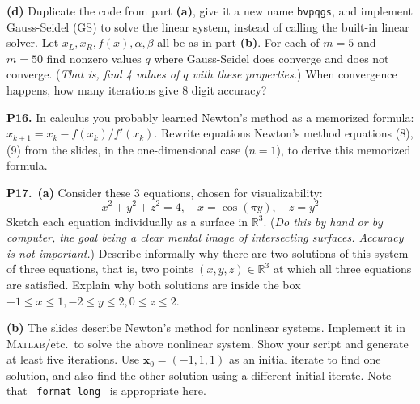 \documentclass[12pt]{amsart}
\newcommand{\bx}{\mathbf{x}}
\newcommand{\RR}{\mathbb{R}}
\newcommand{\prob}[1]{\bigskip\noindent\textbf{#1.}\quad }
\newcommand{\epart}[1]{\medskip\noindent\textbf{(#1)}\quad }
\newcommand{\ppart}[1]{\,\textbf{(#1)}\quad }
\newcommand{\Matlab}{\textsc{Matlab}\xspace}
\begin{document}
\epart{d}  Duplicate the code from part \textbf{(a)}, give it a new name \texttt{bvpqgs}, and implement Gauss-Seidel (GS) to solve the linear system, instead of calling the built-in linear solver.  Let $x_L,x_R,f(x),\alpha,\beta$ all be as in part \textbf{(b)}.  For each of $m=5$ and $m=50$ find nonzero values $q$ where Gauss-Seidel does converge and does not converge.  (\emph{That is, find 4 values of $q$ with these properties.})  When convergence happens, how many iterations give 8 digit accuracy?


\prob{P16}  In calculus you probably learned Newton's method as a memorized formula: $x_{k+1} = x_k - f(x_k)/f'(x_k)$.  Rewrite equations Newton's method equations (8), (9) from the slides, in the one-dimensional case ($n=1$), to derive this memorized formula.


\prob{P17}  \ppart{a}  Consider these 3 equations, chosen for visualizability:
  $$x^2+y^2+z^2 = 4, \quad x = \cos(\pi y), \quad z = y^2$$
Sketch each equation individually as a surface in $\RR^3$.  (\emph{Do this by hand or by computer, the goal being a clear mental image of intersecting surfaces.  Accuracy is not important.})  Describe informally why there are two solutions of this system of three equations, that is, two points $(x,y,z)\in\RR^3$ at which all three equations are satisfied.  Explain why both solutions are inside the box $-1\le x \le 1, -2\le y \le 2, 0\le z \le 2$.

\epart{b}  The slides describe Newton's method for nonlinear systems.  Implement it in \Matlab/etc.~to solve the above nonlinear system.  Show your script and generate at least five iterations.  Use $\bx_0=(-1,1,1)$ as an initial iterate to find one solution, and also find the other solution using a different initial iterate.  Note that \, \texttt{format long} \, is appropriate here.
\end{document}
